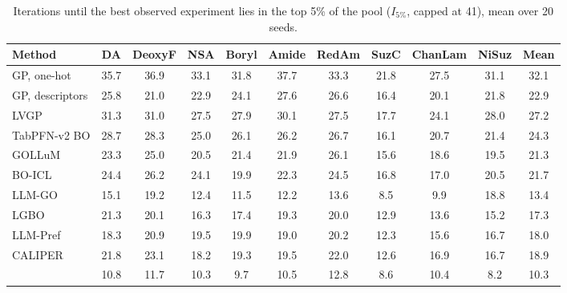 \begin{table}[t]
\centering
\small
\setlength{\tabcolsep}{4.6pt}
\begin{tabular}{@{}l ccccccccc c@{}}
\toprule
Method & DA & DeoxyF & NSA & Boryl & Amide & RedAm & SuzC & ChanLam & NiSuz & Mean \\
\midrule
GP, one-hot & 35.7 & 36.9 & 33.1 & 31.8 & 37.7 & 33.3 & 21.8 & 27.5 & 31.1 & 32.1 \\
GP, descriptors & 25.8 & 21.0 & 22.9 & 24.1 & 27.6 & 26.6 & 16.4 & 20.1 & 21.8 & 22.9 \\
LVGP & 31.3 & 31.0 & 27.5 & 27.9 & 30.1 & 27.5 & 17.7 & 24.1 & 28.0 & 27.2 \\
TabPFN-v2 BO & 28.7 & 28.3 & 25.0 & 26.1 & 26.2 & 26.7 & 16.1 & 20.7 & 21.4 & 24.3 \\
GOLLuM & 23.3 & 25.0 & 20.5 & 21.4 & 21.9 & 26.1 & 15.6 & 18.6 & 19.5 & 21.3 \\
BO-ICL & 24.4 & 26.2 & 24.1 & 19.9 & 22.3 & 24.5 & 16.8 & 17.0 & 20.5 & 21.7 \\
LLM-GO & 15.1 & 19.2 & 12.4 & 11.5 & 12.2 & 13.6 & 8.5 & 9.9 & 18.8 & 13.4 \\
LGBO & 21.3 & 20.1 & 16.3 & 17.4 & 19.3 & 20.0 & 12.9 & 13.6 & 15.2 & 17.3 \\
LLM-Pref & 18.3 & 20.9 & 19.5 & 19.9 & 19.0 & 20.2 & 12.3 & 15.6 & 16.7 & 18.0 \\
CALIPER & 21.8 & 23.1 & 18.2 & 19.3 & 19.5 & 22.0 & 12.6 & 16.9 & 16.7 & 18.9 \\
\ours{} & 10.8 & 11.7 & 10.3 & 9.7 & 10.5 & 12.8 & 8.6 & 10.4 & 8.2 & 10.3 \\
\bottomrule
\end{tabular}
\caption{Iterations until the best observed experiment lies in the top 5\% of the pool ($I_{5\%}$, capped at 41), mean over 20 seeds.}
\label{tab:i1}
\end{table}
